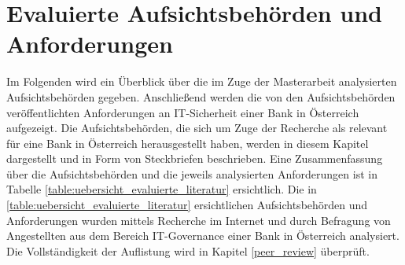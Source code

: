 \section{Evaluierte Aufsichtsbehörden und Anforderungen}\label{uebersicht_evaluierte_literatur_kapitel}
Im Folgenden wird ein Überblick über die im Zuge der Masterarbeit analysierten Aufsichtsbehörden gegeben. Anschließend werden die von den Aufsichtsbehörden veröffentlichten Anforderungen an IT-Sicherheit einer Bank in Österreich aufgezeigt. Die Aufsichtsbehörden, die sich um Zuge der Recherche als relevant für eine Bank in Österreich herausgestellt haben, werden in diesem Kapitel dargestellt und in Form von Steckbriefen beschrieben. Eine Zusammenfassung über die Aufsichtsbehörden und die jeweils analysierten Anforderungen ist in Tabelle \ref{table:uebersicht_evaluierte_literatur} ersichtlich. Die in \ref{table:uebersicht_evaluierte_literatur} ersichtlichen Aufsichtsbehörden und Anforderungen wurden mittels Recherche im Internet und durch Befragung von Angestellten aus dem Bereich \glqq{}IT-Governance\grqq{} einer Bank in Österreich analysiert. Die Vollständigkeit der Auflistung wird in Kapitel \ref{peer_review} überprüft. 
\bigbreak
